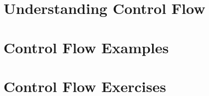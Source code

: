 







\clearpage
\def\pageLang{None}
\section{Understanding Control Flow} %
\label{sec:understanding_control_flow}




\clearpage
\section{Control Flow Examples} %
\label{sec:control_flow_examples}




\clearpage
\section{Control Flow Exercises} %
\label{sec:control_flow_exercises}






